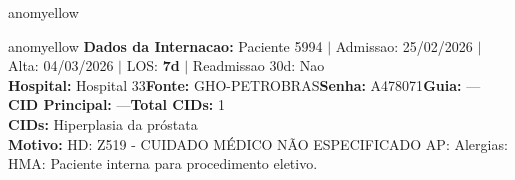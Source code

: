 \documentclass[a4paper,10pt]{article}
\begin{document}
\begin{anomalycard}[Internacao 168076 | GHO-PETROBRAS | MODERADO (z=2.08)]{anomyellow}

\end{anomalycard}

\newpage

\begin{anomalycard}[Internacao 166871 | GHO-PETROBRAS | MODERADO (z=2.08)]{anomyellow}
\textbf{Dados da Internacao:} Paciente 5994 $\mid$ Admissao: 25/02/2026 $\mid$ Alta: 04/03/2026 $\mid$ LOS: \textbf{7d} $\mid$ Readmissao 30d: Nao\\
\textbf{Hospital:} Hospital 33\quad\textbf{Fonte:} GHO-PETROBRAS\quad\textbf{Senha:} A478071\quad\textbf{Guia:} ---\\
\textbf{CID Principal:} {\small ---}\quad\textbf{Total CIDs:} 1\\

\textbf{CIDs:} {\scriptsize Hiperplasia da próstata}\\

\textbf{Motivo:} {\scriptsize HD: Z519 - CUIDADO MÉDICO NÃO ESPECIFICADO AP: Alergias: HMA: Paciente interna para procedimento eletivo.}\\


\end{anomalycard}
\end{document}
